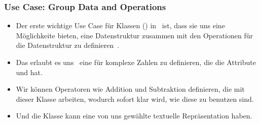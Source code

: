 \documentclass[aspectratio=169,mathserif,notheorems]{beamer}%
\begin{document}
\begin{frame}%
\frametitle{Use Case: Group Data and Operations}%
\begin{itemize}%
\item Der erste wichtige Use Case für Klassen () in \python\ ist, dass sie uns eine Möglichkeite bieten, eine Datenstruktur zusammen mit den Operationen für die Datenstruktur zu definieren~\cite{PSF:P3D:TPT:C}.%
%
\item<2-> Das erlaubt es uns \DEzB\ eine  für komplexe Zahlen zu definieren, die die Attribute  und  hat.%
%
\item<3-> Wir können Operatoren wie Addition und Subtraktion definieren, die mit dieser Klasse arbeiten, wodurch sofort klar wird, wie diese zu benutzen sind.%
%
\item<4-> Und die Klasse kann eine von uns gewählte textuelle Repräsentation haben.%
\end{itemize}%
\end{frame}%
%
\end{document}

